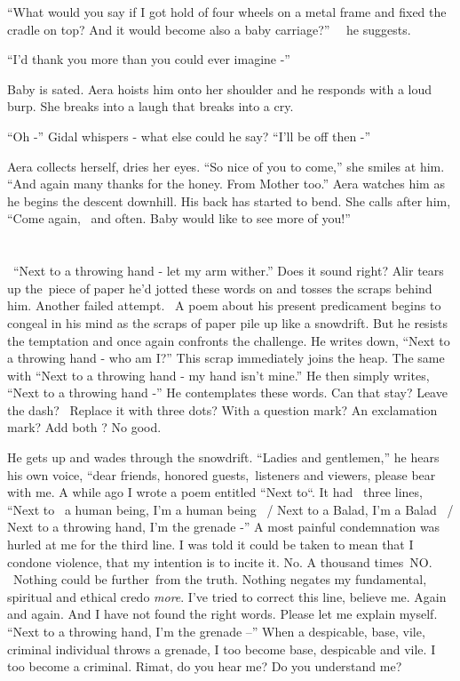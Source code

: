 \documentclass[twoside,11pt]{book}
\begin{document}
``What would you say if I got hold of four wheels on a metal frame and fixed the cradle on top? And it
would become also a baby carriage?'' \ \ he suggests.

``I'd thank you more than you could ever imagine -''

Baby is sated. Aera hoists him onto her shoulder and he responds with a loud burp. She breaks into a laugh that breaks
into a cry.

``Oh -'' Gidal whispers - what else could he say? ``I'll be off then
-''

Aera collects herself, dries her eyes. ``So nice of you to come,'' she smiles at him.
``And again many thanks for the honey. From Mother too.'' Aera watches him as he begins the
descent downhill. His back has started to bend. She calls after him, ``Come again, \ and often. Baby would
like to see more of you!''


\bigskip

\chapter{}

~``Next to a throwing hand - let my arm wither.'' Does it sound right? Alir tears up the~piece of paper
he'd jotted these words on{ }and tosses the scraps behind him. Another failed
attempt. \ A poem about his present predicament begins to congeal in his mind as the scraps of paper pile up like a
snowdrift. But he resists the temptation and once again confronts the challenge. He writes down, ``Next to
a throwing hand - who am I?'' This scrap immediately joins the heap. The same with ``Next to
a throwing hand - my hand isn't mine.'' He then simply{ }writes,
``Next to a throwing hand -'' He contemplates these words. Can that stay? Leave the dash?
\ Replace it with three dots? With a question mark? An exclamation mark? Add both ? No good.

He gets up and wades through the snowdrift. ``Ladies and gentlemen,'' he hears his own voice,
``dear friends, honored guests,~listeners and viewers, please bear with me. A while ago I wrote a poem
entitled ``Next to``. It had~ three lines, ``Next to ~a human being, I'm a human
being ~/ Next to a Balad, I'm a Balad ~/ Next to a throwing hand, I'm the grenade -'' A most
painful{ }condemnation was hurled at me for the third line. I was told it could be taken to mean that I
condone violence, that my intention is to incite it. No. A thousand times~NO. \ Nothing could be further~from the
truth. Nothing negates my fundamental, spiritual and ethical credo \textit{more}. I've tried to correct this line,
believe me. Again and again. And I have not found the right words. Please let me explain myself. ``Next to
a throwing hand, I'm the grenade --'' When a despicable, base, vile, criminal individual throws a grenade,
I too become base, despicable{ }and vile. I too become a criminal. Rimat, do
you hear me? Do you understand me?
\end{document}
